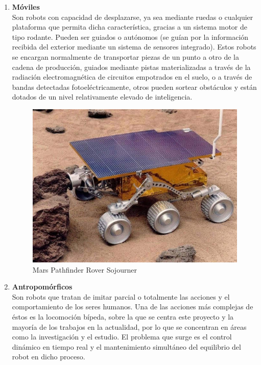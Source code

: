 \begin{enumerate}
\item \textbf{Móviles}\\ Son robots con capacidad de desplazarse, ya sea mediante ruedas o cualquier plataforma que permita dicha característica, gracias a un sistema motor de tipo rodante. Pueden ser guiados o autónomos (se guían por la información recibida del exterior mediante un sistema de sensores integrado). Estos robots se encargan normalmente de transportar piezas de un punto a otro de la cadena de producción, guiados mediante pistas materializadas a través de la radiación electromagnética de circuitos empotrados en el suelo, o a través de bandas detectadas fotoeléctricamente, otros pueden sortear obstáculos y están dotados de un nivel relativamente elevado de inteligencia.

\begin{figure}[H]
\centering
\includegraphics[scale=0.15]{imagenes/apartado_2/22_movil2}
\caption{Mars Pathfinder Rover Sojourner}
\label{figura22}
\end{figure}

\item \textbf{Antropomórficos}\\ Son robots que tratan de imitar parcial o totalmente las acciones y el comportamiento de los seres humanos. Una de las acciones más complejas de éstos es la locomoción bípeda, sobre la que se centra este proyecto y la mayoría de los trabajos en la actualidad, por lo que se concentran en áreas como la investigación y el estudio. El problema que surge es el control dinámico en tiempo real y el mantenimiento simultáneo del equilibrio del robot en dicho proceso.


\end{enumerate}
